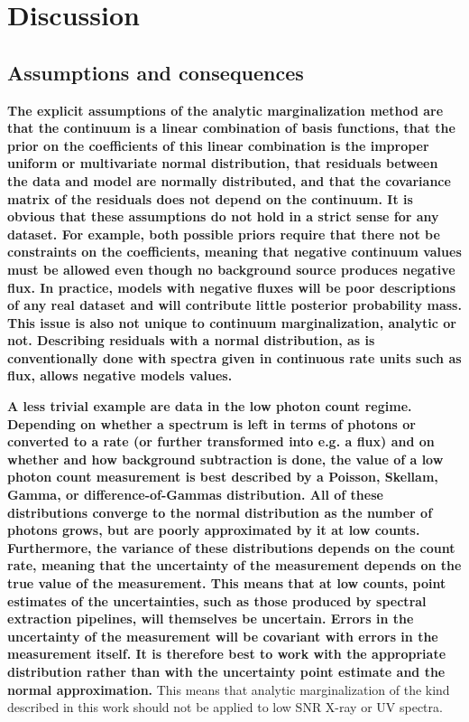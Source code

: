 \documentclass[trackchanges]{aastex62}
\begin{document}
\section{Discussion}
\label{sec:discussion}
\subsection{Assumptions and consequences}
{\color{red}\bf
The explicit assumptions of the analytic marginalization method are that the continuum is a linear combination of basis functions, that the prior on the coefficients of this linear combination is the improper uniform or multivariate normal distribution, that residuals between the data and model are normally distributed, and that the covariance matrix of the residuals does not depend on the continuum.
It is obvious that these assumptions do not hold in a strict sense for any dataset.
For example, both possible priors require that there not be constraints on the coefficients, meaning that negative continuum values must be allowed even though no background source produces negative flux.
In practice, models with negative fluxes will be poor descriptions of any real dataset and will contribute little posterior probability mass.
This issue is also not unique to continuum marginalization, analytic or not.
Describing residuals with a normal distribution, as is conventionally done with spectra given in continuous rate units such as flux, allows negative models values.
}

{\color{red}\bf
A less trivial example are data in the low photon count regime.
Depending on whether a spectrum is left in terms of photons or converted to a rate (or further transformed into e.g. a flux) and on whether and how background subtraction is done, the value of a low photon count measurement is best described by a Poisson, Skellam, Gamma, or difference-of-Gammas distribution.
All of these distributions converge to the normal distribution as the number of photons grows, but are poorly approximated by it at low counts.
Furthermore, the variance of these distributions depends on the count rate, meaning that the uncertainty of the measurement depends on the true value of the measurement.
This means that at low counts, point estimates of the uncertainties, such as those produced by spectral extraction pipelines, will themselves be uncertain.
Errors in the uncertainty of the measurement will be covariant with errors in the measurement itself.
It is therefore best to work with the appropriate distribution rather than with the uncertainty point estimate and the normal approximation.
}
This means that analytic marginalization of the kind described in this work should not be applied to low SNR X-ray or UV spectra.
\end{document}
